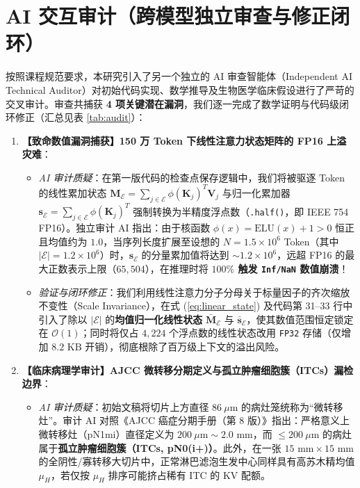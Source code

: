 \documentclass[10pt,twocolumn,a4paper]{ctexart}
\begin{document}
\section{AI 交互审计（跨模型独立审查与修正闭环）}

按照课程规范要求，本研究引入了另一个独立的 AI 审查智能体（Independent AI Technical Auditor）对初始代码实现、数学推导及生物医学临床假设进行了严苛的交叉审计。审查共捕获 \textbf{4 项关键潜在漏洞}，我们逐一完成了数学证明与代码级闭环修正（汇总见表 \ref{tab:audit}）：

\begin{enumerate}
    \item \textbf{【致命数值漏洞捕获】150 万 Token 下线性注意力状态矩阵的 FP16 上溢灾难}：
    \begin{itemize}
        \item \emph{AI 审计质疑}：在第一版代码的检查点保存逻辑中，我们将被驱逐 Token 的线性累加状态 $\mathbf{M}_{\mathcal{E}} = \sum_{j \in \mathcal{E}} \phi(\mathbf{K}_j)^T \mathbf{V}_j$ 与归一化累加器 $\mathbf{s}_{\mathcal{E}} = \sum_{j \in \mathcal{E}} \phi(\mathbf{K}_j)^T$ 强制转换为半精度浮点数（\texttt{.half()}，即 IEEE 754 FP16）。独立审计 AI 指出：由于核函数 $\phi(x) = \text{ELU}(x) + 1 > 0$ 恒正且均值约为 $1.0$，当序列长度扩展至设想的 $N = 1.5 \times 10^6$ Token（其中 $|\mathcal{E}| = 1.2 \times 10^6$）时，$\mathbf{s}_{\mathcal{E}}$ 的分量累加值将达到 $\sim 1.2 \times 10^6$，远超 FP16 的最大正数表示上限（$65,504$），在推理时将 \textbf{$100\%$ 触发 \texttt{Inf/NaN} 数值崩溃}！
        \item \emph{验证与闭环修正}：我们利用线性注意力分子分母关于标量因子的齐次缩放不变性（Scale Invariance），在式 (\ref{eq:linear_state}) 及代码第 31–33 行中引入了除以 $|\mathcal{E}|$ 的\textbf{均值归一化线性状态} $\bar{\mathbf{M}}_{\mathcal{E}}$ 与 $\bar{\mathbf{s}}_{\mathcal{E}}$，使其数值范围恒定锁定在 $\mathcal{O}(1)$；同时将仅占 $4,224$ 个浮点数的线性状态改用 \texttt{FP32} 存储（仅增加 $8.2\text{ KB}$ 开销），彻底根除了百万级上下文的溢出风险。
    \end{itemize}
    \item \textbf{【临床病理学审计】AJCC 微转移分期定义与孤立肿瘤细胞簇（ITCs）漏检边界}：
    \begin{itemize}
        \item \emph{AI 审计质疑}：初始文稿将切片上方直径 $86\ \mu\text{m}$ 的病灶笼统称为“微转移灶”。审计 AI 对照《AJCC 癌症分期手册（第 8 版）》指出：严格意义上微转移灶（pN1mi）直径定义为 $200\ \mu\text{m} \sim 2.0\text{ mm}$，而 $\le 200\ \mu\text{m}$ 的病灶属于\textbf{孤立肿瘤细胞簇（ITCs, pN0(i+)）}。此外，在一张 $15\text{ mm} \times 15\text{ mm}$ 的全阴性/寡转移大切片中，正常淋巴滤泡生发中心同样具有高苏木精均值 $\mu_H$，若仅按 $\mu_H$ 排序可能挤占稀有 ITC 的 KV 配额。

\end{itemize}
\end{enumerate}
\end{document}
